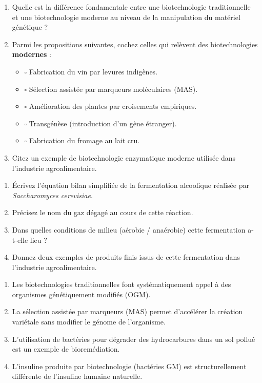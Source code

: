 \documentclass[11pt]{article}
\begin{document}
\begin{exercice}
\begin{enumerate}
    \item Quelle est la différence fondamentale entre une biotechnologie traditionnelle et une biotechnologie moderne au niveau de la manipulation du matériel génétique ?
    \item Parmi les propositions suivantes, cochez celles qui relèvent des biotechnologies \textbf{modernes} :
    \begin{itemize}
        \item[] $\square$ Fabrication du vin par levures indigènes.
        \item[] $\square$ Sélection assistée par marqueurs moléculaires (MAS).
        \item[] $\square$ Amélioration des plantes par croisements empiriques.
        \item[] $\square$ Transgénèse (introduction d'un gène étranger).
        \item[] $\square$ Fabrication du fromage au lait cru.
    \end{itemize}
    \item Citez un exemple de biotechnologie enzymatique moderne utilisée dans l'industrie agroalimentaire.
\end{enumerate}
\end{exercice}

\begin{exercice}
\begin{enumerate}
    \item Écrivez l'équation bilan simplifiée de la fermentation alcoolique réalisée par \textit{Saccharomyces cerevisiae}.
    \item Précisez le nom du gaz dégagé au cours de cette réaction.
    \item Dans quelles conditions de milieu (aérobie / anaérobie) cette fermentation a-t-elle lieu ?
    \item Donnez deux exemples de produits finis issus de cette fermentation dans l'industrie agroalimentaire.
\end{enumerate}
\end{exercice}

\begin{exercice}
\begin{enumerate}
    \item Les biotechnologies traditionnelles font systématiquement appel à des organismes génétiquement modifiés (OGM).
    \item La sélection assistée par marqueurs (MAS) permet d'accélérer la création variétale sans modifier le génome de l'organisme.
    \item L'utilisation de bactéries pour dégrader des hydrocarbures dans un sol pollué est un exemple de bioremédiation.
    \item L'insuline produite par biotechnologie (bactéries GM) est structurellement différente de l'insuline humaine naturelle.
\end{enumerate}
\end{exercice}
\end{document}
